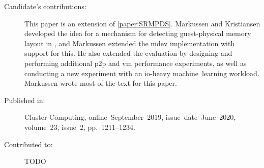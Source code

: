 \begin{description}
	\item[Candidate's contributions:]
		This paper is an extension of \cref{paper:SRMPDS}.
		Markussen and Kristiansen developed the idea for a mechanism for detecting guest-physical memory layout in , and Markussen
		extended the \acrshort{mdev} implementation with support for this.
		He also extended the evaluation by designing and performing additional \acrshort{p2p} and \acrshort{vm} performance experiments,
		as well as conducting a new experiment with an \gls{io}-heavy machine~learning workload.
		Markussen wrote most of the text for this paper.


	\item[Published in:]
		Cluster Computing,
		online~September~2019,
		issue~date~June~2020, 
		volume~23, issue~2, pp.~1211--1234.

	\item[Contributed to:]
		TODO

\end{description}
